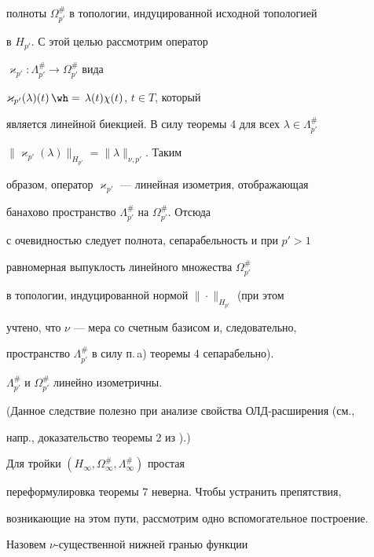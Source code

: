 полноты $\Omega^{\#}_{p'}$ в топологии, индуцированной исходной топологией 


в $H_{p'}$. С этой целью рассмотрим оператор 


$\varkappa_{p'}:\Lambda^{\#}_{p'}\to\Omega^{\#}_{p'}$ вида 


$\varkappa_{p'}(\lambda)(t)\hateq\lambda(t)\chi(t)$, $t\in T$, который 


является линейной биекцией. В силу теоремы 4 для всех $\lambda\in 


\Lambda^{\#}_{p'}$\; 


$\|\varkappa_{p'}(\lambda)\|_{H_{p'}}=\|\lambda\|_{\nu,p'}$. Таким 


образом, оператор $\varkappa_{p'}$ --- линейная изометрия, отображающая 


банахово пространство $\Lambda^{\#}_{p'}$ на $\Omega^{\#}_{p'}$. Отсюда 


с очевидностью следует полнота, сепарабельность и при $p'>1$ 


равномерная выпуклость \cite{17} линейного множества $\Omega^{\#}_{p'}$ 


в топологии, индуцированной нормой $\|\cdot\|_{H_{p'}}$ (при этом 


учтено, что $\nu$ --- мера со счетным базисом и, следовательно, 


пространство $\Lambda^{\#}_{p'}$ в силу п.\,a) теоремы 4 сепарабельно). 


 


\begin{cor} 


$\Lambda^{\#}_{p'}$ и $\Omega^{\#}_{p'}$ линейно изометричны. 


\end{cor} 


 


(Данное следствие полезно при анализе свойства ОЛД-расширения (см., 


напр., доказательство теоремы 2 из \cite{9}).) 


 


Для тройки $(H_\infty,\Omega^{\#}_\infty,\Lambda^{\#}_\infty)$ простая 


переформулировка теоремы 7 неверна. Чтобы устранить препятствия, 


возникающие на этом пути, рассмотрим одно вспомогательное построение. 


Назовем $\nu$-существенной нижней гранью функции 


